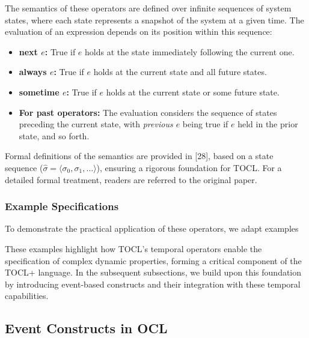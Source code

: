 The semantics of these operators are defined over infinite sequences of system states, where each state represents a snapshot of the system at a given time. The evaluation of an expression depends on its position within this sequence:

\begin{itemize}
  \item \textbf{next $e$:} True if $e$ holds at the state immediately following the current one.
  \item \textbf{always $e$:} True if $e$ holds at the current state and all future states.
  \item \textbf{sometime $e$:} True if $e$ holds at the current state or some future state.
  \item \textbf{For past operators:} The evaluation considers the sequence of states preceding the current state, with \textit{previous $e$} being true if $e$ held in the prior state, and so forth.
\end{itemize}

Formal definitions of the semantics are provided in [28], based on a state sequence ($\hat{\sigma} = \langle \sigma_0, \sigma_1, \ldots \rangle$), ensuring a rigorous foundation for TOCL. For a detailed formal treatment, readers are referred to the original paper.

%
\subsubsection{Example Specifications}
To demonstrate the practical application of these operators, we adapt examples 


These examples highlight how TOCL's temporal operators enable the specification of 
complex dynamic properties, forming a critical component of the TOCL+ language. 
In the subsequent subsections, we build upon this foundation by introducing 
event-based constructs and their integration with these temporal capabilities.

\subsection{Event Constructs in OCL}

